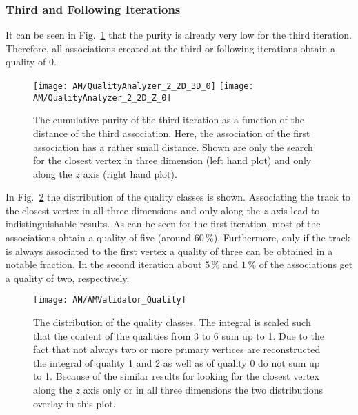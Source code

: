 

\subsubsection{Third and Following Iterations}

It can be seen in Fig.~\ref{plot:AMWFQualityI30} that the purity is already very low for the third iteration. Therefore, all associations created at the third or following iterations obtain a quality of 0.

\begin{figure}[!ht]
    \centering
    \texttt{[image: AM/QualityAnalyzer\_2\_2D\_3D\_0]}
    \texttt{[image: AM/QualityAnalyzer\_2\_2D\_Z\_0]}
    \caption[Cumulative purity of iteration three vs relative difference to define quality for smaller distances of association one]{The cumulative purity of the third iteration as a function of the distance of the third association. Here, the association of the first association has a rather small distance. Shown are only the search for the closest vertex in three dimension (left hand plot) and only along the $z$ axis (right hand plot).\label{plot:AMWFQualityI30}}
\end{figure}

In Fig.~\ref{plot:AMWFQualityDist} the distribution of the quality classes is shown. Associating the track to the closest vertex in all three dimensions and only along the $z$ axis lead to indistinguishable results. As can be seen for the first iteration, most of the associations obtain a quality of five (around $60\,\%$). Furthermore, only if the track is always associated to the first vertex a quality of three can be obtained in a notable fraction. In the second iteration about $5\,\%$ and $1\,\%$ of the associations get a quality of two, respectively.

\begin{figure}[!ht]
    \centering
    \texttt{[image: AM/AMValidator\_Quality]}
    \caption[Distribution of the quality classes]{The distribution of the quality classes. The integral is scaled such that the content of the qualities from 3 to 6 sum up to 1. Due to the fact that not always two or more primary vertices are reconstructed the integral of quality 1 and 2 as well as of quality 0 do not sum up to 1. Because of the similar results for looking for the closest vertex along the $z$ axis only or in all three dimensions the two distributions overlay in this plot. \label{plot:AMWFQualityDist}}
\end{figure}

